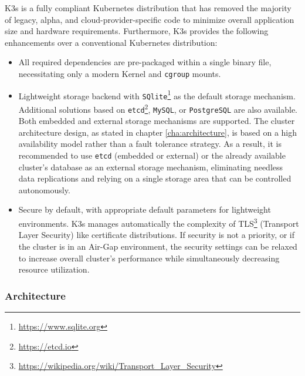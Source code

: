 K3s is a fully compliant Kubernetes distribution that has removed the majority of
legacy, alpha, and cloud-provider-specific code to minimize overall application size
and hardware requirements. Furthermore, K3s provides the following enhancements over
a conventional Kubernetes distribution\cite{k3s_enhancements}:
\begin{itemize}
  \item All required dependencies are pre-packaged within a single binary file,
    necessitating only a modern Kernel and \texttt{cgroup} mounts.

  \item Lightweight storage backend with \texttt{SQlite}\footnote{\url{https://www.sqlite.org}}
    as the default storage mechanism. Additional solutions based on \texttt{etcd}\footnote{\url{https://etcd.io}},
    \texttt{MySQL}, or \texttt{PostgreSQL} are also available. Both embedded and
    external storage mechanisms are supported.
    \newline
    The cluster architecture design, as stated in chapter \ref{cha:architecture},
    is based on a high availability model rather than a fault tolerance strategy.
    As a result, it is recommended to use \texttt{etcd} (embedded or external) or
    the already available cluster's database as an external storage mechanism,
    eliminating needless data replications and relying on a single storage area
    that can be controlled autonomously.

  \item Secure by default, with appropriate default parameters for lightweight
    environments. K3s manages automatically the complexity of TLS\footnote{\url{https://wikipedia.org/wiki/Transport_Layer_Security}}
    (Transport Layer Security) like certificate distributions.
    \newline
    If security is not a priority, or if the cluster is in an Air-Gap environment,
    the security settings can be relaxed to increase overall cluster's
    performance while simultaneously decreasing resource utilization.
\end{itemize}

\subsubsection{Architecture}
\label{subsubsec:implementation_dependencies_k3s_architecture}

